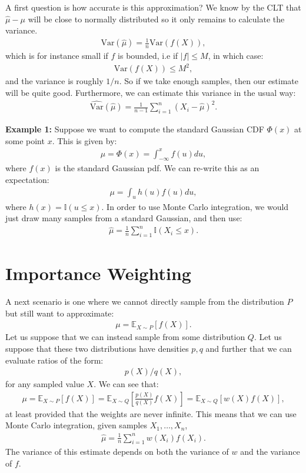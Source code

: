 \documentclass[twoside,12pt]{article}
\begin{document}
A first question is how accurate is this approximation? We know by the CLT that $\widehat{\mu} - \mu$ will be close to normally distributed so it only remains to calculate the variance.
\begin{align*}
\mathrm{Var}(\widehat{\mu}) = \frac{1}{n} \mathrm{Var}(f(X)),
\end{align*}
which is for instance small if $f$ is bounded, i.e if $|f| \leq M$, in which case:
\begin{align*}
\mathrm{Var}(f(X)) \leq M^2,
\end{align*}
and the variance is roughly $1/n$. So if we take enough samples, then our estimate will be quite good.
Furthermore, we can estimate this variance in the usual way:
\begin{align*}
\widehat{\text{Var}}(\widehat{\mu}) = \frac{1}{n-1} \sum_{i=1}^n (X_i - \widehat{\mu})^2. 
\end{align*}

{\bf Example 1: } Suppose we want to compute the standard Gaussian CDF $\Phi(x)$ at some point $x$. This is given by:
\begin{align*}
\mu = \Phi(x) = \int_{-\infty}^x f(u) du,
\end{align*}
where $f(x)$ is the standard Gaussian pdf. We can re-write this as an expectation:
\begin{align*}
\mu = \int_u h(u) f(u) du,
\end{align*}
where $h(x) = \mathbb{I}(u \leq x)$. In order to use Monte Carlo integration, we would just draw many samples from a standard Gaussian, and then use:
\begin{align*}
\widehat{\mu} = \frac{1}{n} \sum_{i=1}^n \mathbb{I}(X_i \leq x).
\end{align*}

\section{Importance Weighting}
A next scenario is one where we cannot directly sample from the distribution $P$ but still want
to approximate:
\begin{align*}
\mu = \mathbb{E}_{X \sim P} [f(X)]. 
\end{align*}
Let us suppose that we can instead sample from some distribution $Q$. Let us suppose that these two distributions have densities $p,q$ and 
further that we can evaluate ratios of the form:
\begin{align*}
p(X)/q(X),
\end{align*}
for any sampled value $X$.
We can see that:
\begin{align*}
\mu =  \mathbb{E}_{X \sim P} [f(X)] = \mathbb{E}_{X \sim Q} \left[\frac{p(X)}{q(X)} f(X) \right] = 
\mathbb{E}_{X \sim Q} [w(X) f(X)],
\end{align*}
at least provided that the weights are never infinite.
This means that we can use Monte Carlo integration, given samples $X_1,\ldots,X_n$, 
\begin{align*}
\widehat{\mu} = \frac{1}{n} \sum_{i=1}^n w(X_i) f(X_i).
\end{align*}
The variance of this estimate depends on both the variance of $w$ and the variance of $f$.
\end{document}
